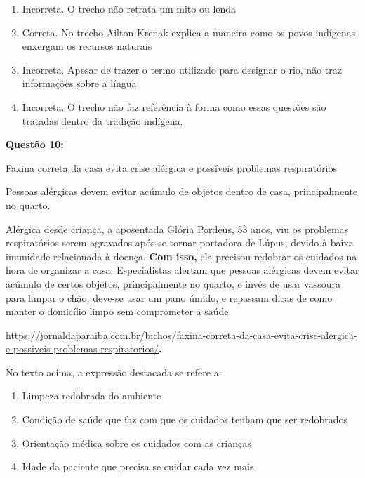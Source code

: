 {\begin{enumerate}
\def\labelenumi{\arabic{enumi}.}
\item
  Incorreta. O trecho não retrata um mito ou lenda
\item
  Correta. No trecho Ailton Krenak explica a maneira como os povos
  indígenas enxergam os recursos naturais
\item
  Incorreta. Apesar de trazer o termo utilizado para designar o rio, não
  traz informações sobre a língua
\item
  Incorreta. O trecho não faz referência à forma como essas questões são
  tratadas dentro da tradição indígena.
\end{enumerate}

\textbf{Questão 10:}

Faxina correta da casa evita crise alérgica e possíveis problemas
respiratórios

Pessoas alérgicas devem evitar acúmulo de objetos dentro de casa,
principalmente no quarto.

Alérgica desde criança, a aposentada Glória Pordeus, 53 anos, viu os
problemas respiratórios serem agravados após se tornar portadora de
Lúpus, devido à baixa imunidade relacionada à doença. \textbf{Com isso,}
ela precisou redobrar os cuidados na hora de organizar a casa.
Especialistas alertam que pessoas alérgicas devem evitar acúmulo de
certos objetos, principalmente no quarto, e invés de usar vassoura para
limpar o chão, deve-se usar um pano úmido, e repassam dicas de como
manter o domicílio limpo sem comprometer a saúde.

\href{https://jornaldaparaiba.com.br/bichos/faxina-correta-da-casa-evita-crise-alergica-e-possiveis-problemas-respiratorios/}{\uline{https://jornaldaparaiba.com.br/bichos/faxina-correta-da-casa-evita-crise-alergica-e-possiveis-problemas-respiratorios/}}\textbf{.}

No texto acima, a expressão destacada se refere a:

\begin{enumerate}
\def\labelenumi{\alph{enumi})}
\item
  Limpeza redobrada do ambiente
\item
  Condição de saúde que faz com que os cuidados tenham que ser
  redobrados
\item
  Orientação médica sobre os cuidados com as crianças
\item
  Idade da paciente que precisa se cuidar cada vez mais
\end{enumerate}

}
